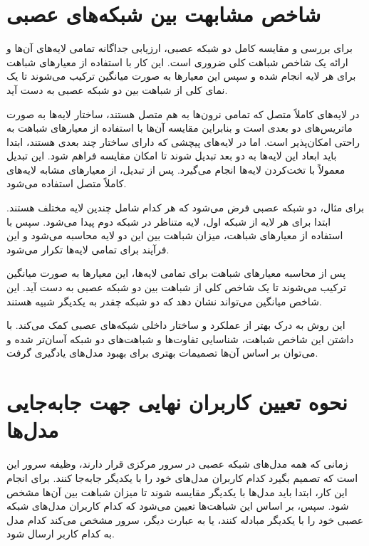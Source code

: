 \section{شاخص مشابهت بین شبکه‌های عصبی}
برای بررسی و مقایسه کامل دو شبکه عصبی، ارزیابی جداگانه تمامی لایه‌های آن‌ها و ارائه یک شاخص شباهت کلی ضروری است. این کار با استفاده از معیارهای شباهت برای هر لایه انجام شده و سپس این معیارها به صورت میانگین ترکیب می‌شوند تا یک نمای کلی از شباهت بین دو شبکه عصبی به دست آید.

در لایه‌های کاملاً متصل%
که تمامی نرون‌ها به هم متصل هستند، ساختار لایه‌ها به صورت ماتریس‌های دو بعدی است و بنابراین مقایسه آن‌ها با استفاده از معیارهای شباهت به راحتی امکان‌پذیر است. اما در لایه‌های پیچشی%
که دارای ساختار چند بعدی هستند، ابتدا باید ابعاد این لایه‌ها به دو بعد تبدیل شوند تا امکان مقایسه فراهم شود. این تبدیل معمولاً با تخت‌کردن%
لایه‌ها انجام می‌گیرد. پس از تبدیل، از معیارهای مشابه لایه‌های کاملاً متصل استفاده می‌شود.

برای مثال، دو شبکه عصبی فرض می‌شود که هر کدام شامل چندین لایه مختلف هستند. ابتدا برای هر لایه از شبکه اول، لایه متناظر در شبکه دوم پیدا می‌شود. سپس با استفاده از معیارهای شباهت، میزان شباهت بین این دو لایه محاسبه می‌شود و این فرآیند برای تمامی لایه‌ها تکرار می‌شود.

پس از محاسبه معیارهای شباهت برای تمامی لایه‌ها، این معیارها به صورت میانگین ترکیب می‌شوند تا یک شاخص کلی از شباهت بین دو شبکه عصبی به دست آید. این شاخص میانگین می‌تواند نشان دهد که دو شبکه چقدر به یکدیگر شبیه هستند.

این روش به درک بهتر از عملکرد و ساختار داخلی شبکه‌های عصبی کمک می‌کند. با داشتن این شاخص شباهت، شناسایی تفاوت‌ها و شباهت‌های دو شبکه آسان‌تر شده و می‌توان بر اساس آن‌ها تصمیمات بهتری برای بهبود مدل‌های یادگیری گرفت.



\section{نحوه تعیین کاربران نهایی جهت جابه‌جایی مدل‌ها}
زمانی که همه مدل‌های شبکه عصبی در سرور مرکزی قرار دارند، وظیفه سرور این است که تصمیم بگیرد کدام کاربران مدل‌های خود را با یکدیگر جابه‌جا کنند. برای انجام این کار، ابتدا باید مدل‌ها با یکدیگر مقایسه شوند تا میزان شباهت بین آن‌ها مشخص شود. سپس، بر اساس این شباهت‌ها تعیین می‌شود که کدام کاربران مدل‌های شبکه عصبی خود را با یکدیگر مبادله کنند، یا به عبارت دیگر، سرور مشخص می‌کند کدام مدل به کدام کاربر ارسال شود.

